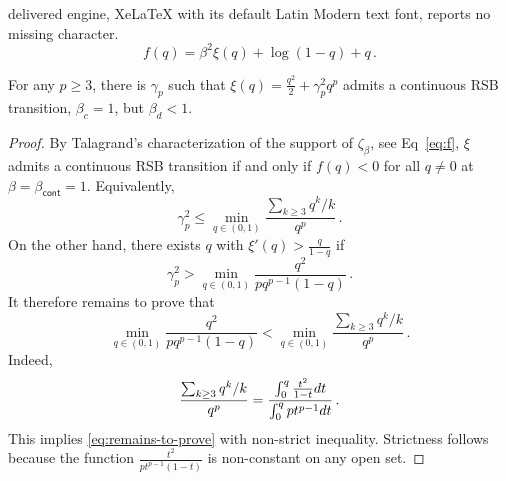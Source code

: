 \documentclass[10pt,a4paper]{amsart}
\def\cont{{\mathsf{cont}}}
\def\de{{\rm d}}
\begin{document}
delivered engine, XeLaTeX with its default Latin Modern text font, reports no missing character.
\begin{equation}\label{eq:f}
f(q) = \beta^2 \xi(q) + \log(1-q)+q\,.
\end{equation}

\begin{proposition}
For any $p\geq 3$, there is $\gamma_p$ such that $\xi(q)=\frac{q^2}{2}+\gamma_p^2 q^p$ admits a continuous RSB transition, $\beta_c=1$, but $\beta_d<1$.
\end{proposition}

\begin{proof}
By Talagrand's characterization of the support of $\zeta_\beta$, see Eq~\eqref{eq:f}, $\xi$ admits a continuous RSB transition if and only if $f(q)<0$ for all $q \neq 0$ at $\beta = \beta_{\cont} = 1$. Equivalently, 
\[
\gamma_p^2 
\leq 
\min_{q\in (0,1)}
\frac{\sum_{k\geq 3} q^k /k}{q^p}\, .
\]
On the other hand, there exists $q$ with $\xi'(q)>\frac{q}{1-q}$ if 
\[
\gamma_p^2 
>
\min_{q\in (0,1)}
\frac{q^2}{pq^{p-1}(1-q)}\,.
\]
It therefore remains to prove that
\begin{equation}
\label{eq:remains-to-prove}
\min_{q\in (0,1)}
\frac{q^2}{pq^{p-1}(1-q)}
<
\min_{q\in (0,1)}
\frac{\sum_{k\geq 3} q^k /k}{q^p}\,.
\end{equation}
Indeed,
\[
\frac{\sum_{k\geq 3} q^k /k}{q^p}
=
\frac{\int_0^q \frac{t^2}{1-t}\de t}{\int_0^q pt^{p-1}\de t}
\,.
\]
This implies \eqref{eq:remains-to-prove} with non-strict inequality.
Strictness follows because the function $\frac{t^2}{pt^{p-1}(1-t)}$ is non-constant on any open set. 
\end{proof}
\end{document}
